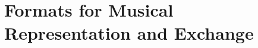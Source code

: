 \section{Formats for Musical Representation and Exchange}\label{sec:musical-representation-and-exchange}



